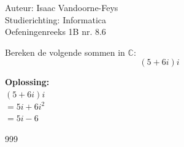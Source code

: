 \documentclass[a4paper]{article}
\begin{document}
  
\noindent \large Auteur: Isaac Vandoorne-Feys \\
\noindent \large Studierichting: Informatica\\
\noindent \large Oefeningenreeks 1B nr. 8.6\\

\medskip

\normalsize
	Bereken de volgende sommen in $\mathbb{C}$:
	\begin{equation*}
		(5+6i)i
	\end{equation*}
	
	
	\textbf{Oplossing:}\\
	
	$ (5+6i)i $ \\	
	
	$= 5i+6i^{2} $ \\	
	
	$= 5i-6 $ \\
\begin{thebibliography}{999}
\end{thebibliography}
\end{document}

